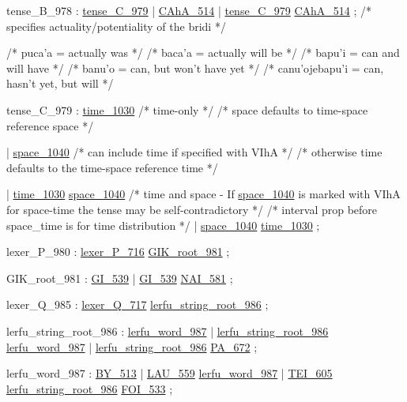 \label{html:y978}
tense_B_978             :  \hyperref[html:y979]{tense_C_979}
                        |  \hyperref[html:y514]{CAhA_514}
                        |  \hyperref[html:y979]{tense_C_979}  \hyperref[html:y514]{CAhA_514}
                        ;
/* specifies actuality/potentiality of the bridi */

/* puca'a = actually was */
/* baca'a = actually will be */
/* bapu'i = can and will have */
/* banu'o = can, but won't have yet */
/* canu'ojebapu'i = can, hasn't yet, but will */

\label{html:y979}
tense_C_979             :  \hyperref[html:y1030]{time_1030}
   /* time-only */
   /* space defaults to time-space reference space */

                    |  \hyperref[html:y1040]{space_1040}
   /* can include time if specified with VIhA */
   /* otherwise time defaults to the time-space reference time */

                    |  \hyperref[html:y1030]{time_1030}  \hyperref[html:y1040]{space_1040}
   /* time and space - If \hyperref[html:y1040]{space_1040} is marked with
   VIhA for space-time the tense may be self-contradictory */
   /* interval prop before space_time is for time distribution */
                        |  \hyperref[html:y1040]{space_1040}  \hyperref[html:y1030]{time_1030}
                        ;

\label{html:y980}
lexer_P_980             :  \hyperref[html:y716]{lexer_P_716}  \hyperref[html:y981]{GIK_root_981}
                        ;

\label{html:y981}
GIK_root_981            :  \hyperref[html:y539]{GI_539}
                        |  \hyperref[html:y539]{GI_539}  \hyperref[html:y581]{NAI_581}
                        ;

\label{html:y985}
lexer_Q_985             :  \hyperref[html:y717]{lexer_Q_717}  \hyperref[html:y986]{lerfu_string_root_986}
                        ;

\label{html:y986}
lerfu_string_root_986   :  \hyperref[html:y987]{lerfu_word_987}
                        |  \hyperref[html:y986]{lerfu_string_root_986}  \hyperref[html:y987]{lerfu_word_987}
                        |  \hyperref[html:y986]{lerfu_string_root_986}  \hyperref[html:y672]{PA_672}
                        ;

\label{html:y987}
lerfu_word_987          :  \hyperref[html:y513]{BY_513}
                        |  \hyperref[html:y559]{LAU_559}  \hyperref[html:y987]{lerfu_word_987}
                        |  \hyperref[html:y605]{TEI_605}  \hyperref[html:y986]{lerfu_string_root_986}  \hyperref[html:y533]{FOI_533}
                        ;

